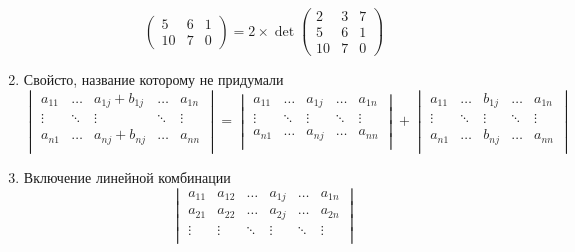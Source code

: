 \documentclass[class=article,a4paper,12pt,crop=false]{standalone}
\begin{document}
\begin{enumerate}
{\begin{equation}
{\begin{pmatrix}
          5 & 6 & 1 \\
          10 & 7 & 0
        \end{pmatrix}
      } = 2 \times \det{
        \begin{pmatrix}
          2 & 3 & 7 \\
          5 & 6 & 1 \\
          10 & 7 & 0
        \end{pmatrix}
      }
    \end{equation}
  }
  \item {
    Свойсто, название которому не придумали
      \begin{equation}
        \begin{vmatrix}
          a_{11} & \dots & a_{1j} + b_{1j} & \dots & a_{1n} \\
          \vdots & \ddots & \vdots & \ddots & \vdots \\
          a_{n1} & \dots & a_{nj} + b_{nj} & \dots & a_{nn} \\
        \end{vmatrix}
      = %
        \begin{vmatrix}
          a_{11} & \dots & a_{1j} & \dots & a_{1n} \\
          \vdots & \ddots & \vdots & \ddots & \vdots \\
          a_{n1} & \dots & a_{nj} & \dots & a_{nn} \\
        \end{vmatrix}
       +
        \begin{vmatrix}
          a_{11} & \dots & b_{1j} & \dots & a_{1n} \\
          \vdots & \ddots & \vdots & \ddots & \vdots \\
          a_{n1} & \dots & b_{nj} & \dots & a_{nn} \\
        \end{vmatrix}
      \end{equation}
  }
  \item {
    Включение линейной комбинации
    \begin{equation}
      \begin{vmatrix}
        a_{11} & a_{12} & \dots & a_{1j} & \dots & a_{1n} \\
        a_{21} & a_{22} & \dots & a_{2j} & \dots & a_{2n} \\
        \vdots & \vdots & \ddots & \vdots & \ddots & \vdots \\

\end{vmatrix}
\end{equation}}
\end{enumerate}
\end{document}
